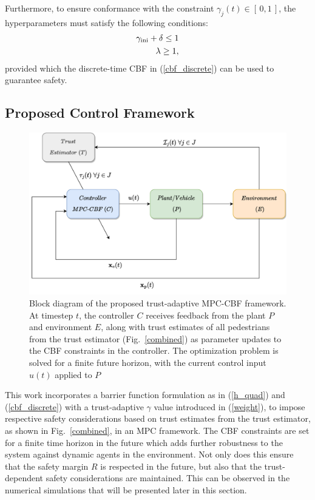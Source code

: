 \documentclass[journal]{IEEEtran}
\begin{document}
Furthermore, to ensure conformance with the constraint $\gamma_j(t) \in [\,0,1\,]$, the hyperparameters must satisfy the following conditions:
\begin{subequations}
    \begin{align}
    \gamma_{\rm ini} + \delta \leq 1\\
    \lambda \geq 1,
    \end{align}
\end{subequations}
provided which the discrete-time CBF in (\ref{cbf_discrete}) can be used to guarantee safety.

\subsection{Proposed Control Framework}
\begin{figure}
  \centering
  \includegraphics[width=1.1\columnwidth]{figures/control.pdf}
  \caption{Block diagram of the proposed trust-adaptive MPC-CBF framework. At timestep $t$, the controller $C$ receives feedback from the plant $P$ and environment $E$, along with trust estimates of all pedestrians from the trust estimator (Fig.~\ref{combined}) as parameter updates to the CBF constraints in the controller. The optimization problem is solved for a finite future horizon, with the current control input $u(t)$ applied to $P$}
  \label{control-frame} %
\end{figure}
This work incorporates a barrier function formulation as in (\ref{h_quad}) and (\ref{cbf_discrete}) with a trust-adaptive $\gamma$ value introduced in (\ref{weight}), to impose respective safety considerations based on trust estimates from the trust estimator, as shown in Fig.~\ref{combined}, in an MPC framework. The CBF constraints are set for a finite time horizon in the future which adds further robustness to the system against dynamic agents in the environment. Not only does this ensure that the safety margin $R$ is respected in the future, but also that the trust-dependent safety considerations are maintained. This can be observed in the numerical simulations that will be presented later in this section.
\end{document}
